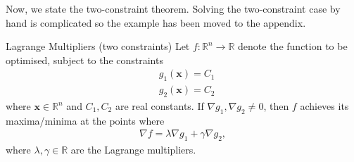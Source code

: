 \documentclass[11pt]{article}
\newcommand{\R}{\mathbb{R}}
\newcommand{\vx}{\bm{x}}
\begin{document}
	\noindent Now, we state the two-constraint theorem. Solving the two-constraint case by hand is complicated so the example has been moved to the appendix.\\
	\begin{theorem}{Lagrange Multipliers (two constraints)}{}
			Let \( f:\R^n \to\R \) denote the function to be optimised, subject to the constraints 
		\begin{align*}
			& g_{1}(\vx) = C_1 \\
			& g_{2}(\vx) = C_2 
		\end{align*}
		where \( \vx\in\R^n \) and \( C_1, C_2 \) are real constants. If \( \nabla g_1, \nabla g_2 \neq0 \), then \( f \) achieves its maxima/minima at the points where
		\begin{align*}
			\nabla f = \lambda \nabla g_1 + \gamma \nabla g_2,
		\end{align*}
		where \( \lambda, \gamma \in\R\) are the Lagrange multipliers.
	\end{theorem}
	\newpage
\end{document}
